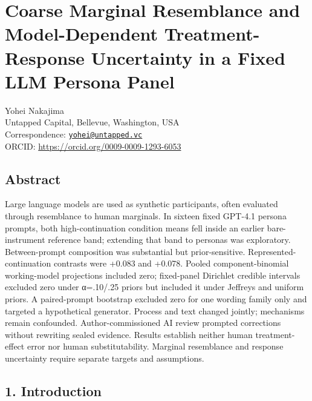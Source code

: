 \documentclass[11pt]{article}
\begin{document}
\section{Coarse Marginal Resemblance and Model-Dependent
Treatment-Response Uncertainty in a Fixed LLM Persona
Panel}\label{coarse-marginal-resemblance-and-model-dependent-treatment-response-uncertainty-in-a-fixed-llm-persona-panel}

Yohei Nakajima\\
Untapped Capital, Bellevue, Washington, USA\\
Correspondence:
\href{mailto:yohei@untapped.vc}{\nolinkurl{yohei@untapped.vc}}\\
ORCID: \url{https://orcid.org/0009-0009-1293-6053}

\subsection{Abstract}\label{abstract}

Large language models are used as synthetic participants, often
evaluated through resemblance to human marginals. In sixteen fixed
GPT-4.1 persona prompts, both high-continuation condition means fell
inside an earlier bare-instrument reference band; extending that band to
personas was exploratory. Between-prompt composition was substantial but
prior-sensitive. Represented-continuation contrasts were +0.083 and
+0.078. Pooled component-binomial working-model projections included
zero; fixed-panel Dirichlet credible intervals excluded zero under
α=.10/.25 priors but included it under Jeffreys and uniform priors. A
paired-prompt bootstrap excluded zero for one wording family only and
targeted a hypothetical generator. Process and text changed jointly;
mechanisms remain confounded. Author-commissioned AI review prompted
corrections without rewriting sealed evidence. Results establish neither
human treatment-effect error nor human substitutability. Marginal
resemblance and response uncertainty require separate targets and
assumptions.

\subsection{1. Introduction}\label{introduction}
\end{document}
